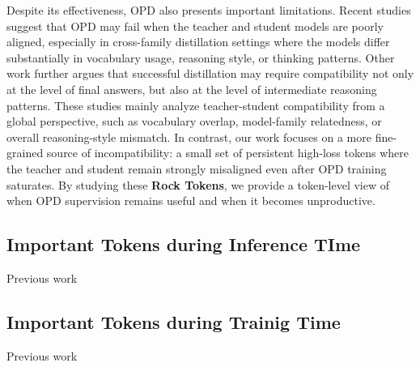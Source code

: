 Despite its effectiveness, OPD also presents important limitations. Recent studies suggest that OPD may fail when the teacher and student models are poorly aligned, especially in cross-family distillation settings where the models differ substantially in vocabulary usage, reasoning style, or thinking patterns. Other work further argues that successful distillation may require compatibility not only at the level of final answers, but also at the level of intermediate reasoning patterns. These studies mainly analyze teacher-student compatibility from a global perspective, such as vocabulary overlap, model-family relatedness, or overall reasoning-style mismatch. In contrast, our work focuses on a more fine-grained source of incompatibility: a small set of persistent high-loss tokens where the teacher and student remain strongly misaligned even after OPD training saturates. By studying these \textbf{Rock Tokens}, we provide a token-level view of when OPD supervision remains useful and when it becomes unproductive.


\subsection{Important Tokens during Inference TIme}
Previous work ~\cite{gupta2025llms,beurer2024guiding}


\subsection{Important Tokens during Trainig Time}

Previous work~\cite{wangbeyond,wu2025mitigating,yang2025token,meng2026sparse}